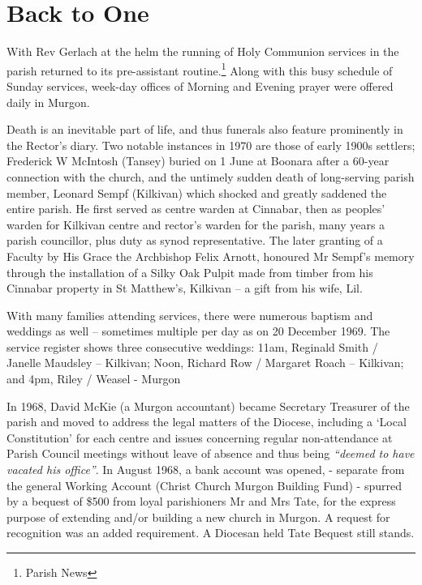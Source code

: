 \section{Back to One}



With Rev Gerlach at the helm the running of Holy Communion services in the parish returned to its pre-assistant routine.\footnote{Parish News} Along with this busy schedule of Sunday services, week-day offices of Morning and Evening prayer were offered daily in Murgon.


Death is an inevitable part of life, and thus funerals also feature prominently in the Rector's diary. Two notable instances in 1970 are those of early 1900s settlers; Frederick W McIntosh (Tansey) buried on 1 June at Boonara after a 60-year connection with the church, and the untimely sudden death of long-serving parish member, Leonard Sempf (Kilkivan) which shocked and greatly saddened the entire parish. He first served as centre warden at Cinnabar, then as peoples' warden for Kilkivan centre and rector's warden for the parish, many years a parish councillor, plus duty as synod representative. The later granting of a Faculty by His Grace the Archbishop Felix Arnott, honoured Mr Sempf's memory through the installation of a Silky Oak Pulpit made from timber from his Cinnabar property in St Matthew's, Kilkivan -- a gift from his wife, Lil.



With many families attending services, there were numerous baptism and weddings as well -- sometimes multiple per day as on 20 December 1969. The service register shows three consecutive weddings: 11am, Reginald Smith / Janelle Maudsley -- Kilkivan; Noon, Richard Row / Margaret Roach -- Kilkivan; and 4pm, Riley / Weasel - Murgon



In 1968, David McKie (a Murgon accountant) became Secretary Treasurer of the parish and moved to address the legal matters of the Diocese, including a `Local Constitution' for each centre and issues concerning regular non-attendance at Parish Council meetings without leave of absence and thus being \emph{``deemed to have vacated his office''}. In August 1968, a bank account was opened, - separate from the general Working Account (Christ Church Murgon Building Fund) - spurred by a bequest of \$500 from loyal parishioners Mr and Mrs Tate, for the express purpose of extending and/or building a new church in Murgon. A request for recognition was an added requirement. A Diocesan held Tate Bequest still stands.




